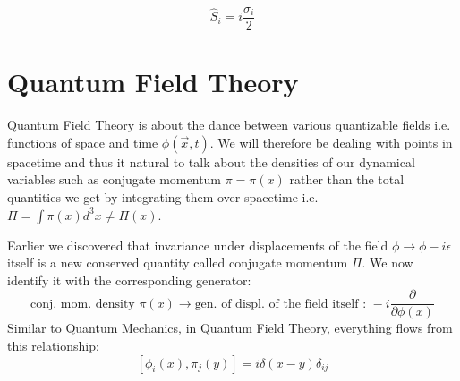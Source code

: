 \begin{equation}
\hat{S}_{i} = i\frac{\sigma_{i}}{2}
\end{equation}

\section{Quantum Field Theory}
Quantum Field Theory is about the dance between various quantizable fields i.e. functions of space and time $\phi (\vec{x},t)$. We will therefore be dealing with points in spacetime and thus it natural to talk about the densities of our dynamical variables such as conjugate momentum $\pi = \pi (x)$ rather than the total quantities we get by integrating them over spacetime i.e. $\Pi = \int \pi (x) d^{3}x \neq \Pi (x)$.

Earlier we discovered that invariance under displacements of the field $\phi \rightarrow \phi - i \epsilon$ itself is a new conserved quantity called conjugate momentum $\Pi$. We now identify it with the corresponding generator:
\begin{equation}
\text{conj. mom. density }	\pi (x) \rightarrow \text{gen. of displ. of the field itself : } -i\frac{\partial}{\partial \phi (x)}
\end{equation}
Similar to Quantum Mechanics, in Quantum Field Theory, everything flows from this relationship:
\begin{equation}
\left[\phi_{i} (x), \pi_{j} (y)\right] = i \delta (x-y) \delta_{ij}
\end{equation}

